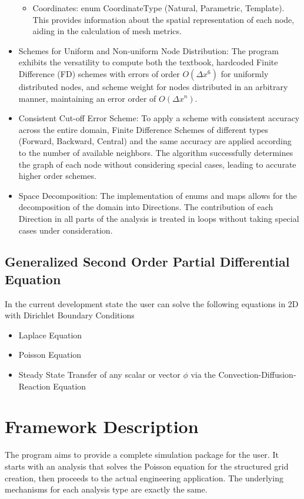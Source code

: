 \documentclass{article}
\begin{document}
\begin{itemize}
\begin{itemize}
			\item Coordinates: enum CoordinateType (Natural, Parametric, Template). \newline
			This provides information about the spatial representation of each node, aiding in the calculation of mesh metrics.
		\end{itemize}
		
		\item Schemes for Uniform and Non-uniform Node Distribution: The program exhibits the versatility to compute both the textbook, hardcoded Finite Difference (FD) schemes with errors of order $O(\Delta x^6)$ for uniformly distributed nodes, and scheme weight for nodes distributed in an arbitrary manner, maintaining an error order of $O(\Delta x^n)$.
		
		\item Consistent Cut-off Error Scheme: To apply a scheme with consistent accuracy across the entire domain, Finite Difference Schemes of different types (Forward, Backward, Central) and the same accuracy are applied according to the number of available neighbors. The algorithm successfully determines the graph of each node without considering special cases, leading to accurate higher order schemes.
		
		\item Space Decomposition: The implementation of enums and maps allows for the decomposition of the domain into Directions. The contribution of each Direction in all parts of the analysis is treated in loops without taking special cases under consideration.
		\end{itemize}
	\subsection{Generalized Second Order Partial Differential Equation}


	\noindent In the current development state the user can solve the following equations in 2D with Dirichlet Boundary Conditions
		\begin{itemize}
			\item Laplace Equation
			\item Poisson Equation
			\item Steady State Transfer of any scalar or vector $\phi$ via the Convection-Diffusion-Reaction Equation
		\end{itemize}

		
	\section{Framework Description}
	The program aims to provide a complete simulation package for the user. It starts with an analysis that solves the Poisson equation for the structured grid creation, then proceeds to the actual engineering application. The underlying mechanisms for each analysis type are exactly the same.	
\end{document}
